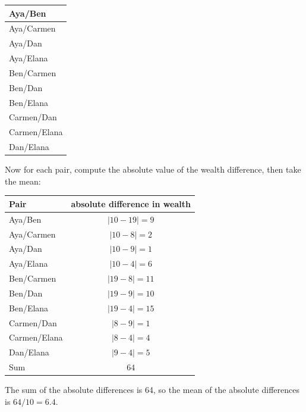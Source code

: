 \documentclass[12pt]{memoir}\usepackage[]{graphicx}\usepackage[table]{xcolor}
\begin{document}
\begin{center}
\begin{tabular}{l}
\toprule
Aya/Ben \\ \midrule
Aya/Carmen \\ \midrule
Aya/Dan \\ \midrule
Aya/Elana \\ \midrule
Ben/Carmen \\ \midrule
Ben/Dan \\ \midrule
Ben/Elana \\ \midrule
Carmen/Dan \\ \midrule
Carmen/Elana \\ \midrule
Dan/Elana \\ 
\bottomrule
\end{tabular}
\end{center}

Now for each pair, compute the absolute value of the wealth difference, then 
take the mean: 

\begin{center}
\begin{tabular}{lc}
\toprule
Pair         & absolute difference in wealth \\ \midrule
Aya/Ben      & $|10 - 19| = 9$  \\ \midrule
Aya/Carmen   & $|10 - 8|  = 2$  \\ \midrule
Aya/Dan      & $|10 - 9|  = 1$  \\ \midrule
Aya/Elana    & $|10 - 4|  = 6$  \\ \midrule
Ben/Carmen   & $|19 - 8|  = 11$ \\ \midrule
Ben/Dan      & $|19 - 9| = 10$ \\ \midrule
Ben/Elana    & $|19 - 4| = 15$ \\ \midrule
Carmen/Dan   & $|8 - 9|  =  1$  \\ \midrule
Carmen/Elana & $|8 - 4|  =  4$  \\ \midrule
Dan/Elana    & $|9 - 4|  =  5$  \\ \bottomrule
Sum          &     $64$ \\
\end{tabular}
\end{center}

The sum of the absolute differences is 64, so the mean of the absolute differences
is $64/10 = 6.4$.

%
\end{document}
